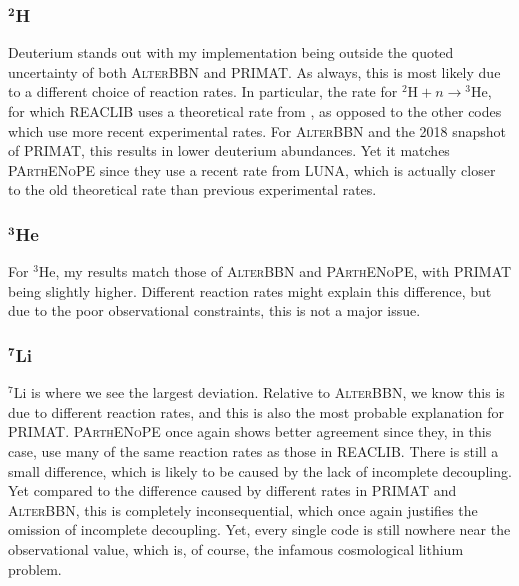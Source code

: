 \subsubsection{$^\textbf{2}$H}
Deuterium stands out with my implementation being outside the quoted uncertainty of both \textsc{AlterBBN} and PRIMAT. As always, this is most likely due to a different choice of reaction rates. In particular, the rate for ${}^2\text{H}+n\rightarrow {}^3\text{He}$, for which REACLIB uses a theoretical rate from \textcite{Reaclibdphe3_2004}, as opposed to the other codes which use more recent experimental rates. For \textsc{AlterBBN} and the 2018 snapshot of PRIMAT, this results in lower deuterium abundances. Yet it matches \textsc{PArthENoPE} since they use a recent rate from LUNA, which is actually closer to the old theoretical rate than previous experimental rates\cite{Luna_impact_Pisanti_2021}. 

\subsubsection{$^\textbf{3}$He}
For $^{3}$He, my results match those of \textsc{AlterBBN} and \textsc{PArthENoPE}, with PRIMAT being slightly higher. Different reaction rates might explain this difference, but due to the poor observational constraints, this is not a major issue. 

\subsubsection{$^\textbf{7}$Li}
${}^7\text{Li}$ is where we see the largest deviation. Relative to \textsc{AlterBBN}, we know this is due to different reaction rates, and this is also the most probable explanation for PRIMAT. \textsc{PArthENoPE} once again shows better agreement since they, in this case, use many of the same reaction rates as those in REACLIB. There is still a small difference, which is likely to be caused by the lack of incomplete decoupling. Yet compared to the difference caused by different rates in PRIMAT and \textsc{AlterBBN}, this is completely inconsequential, which once again justifies the omission of incomplete decoupling. Yet, every single code is still nowhere near the observational value, which is, of course, the infamous cosmological lithium problem.


